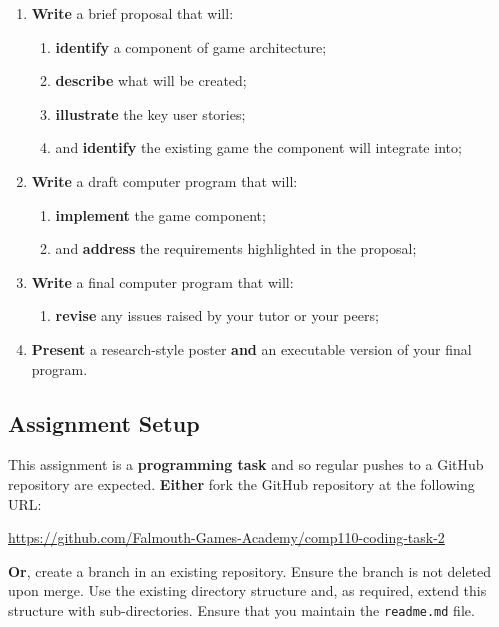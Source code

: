 \documentclass{../fal_assignment}
\begin{document}
\begin{enumerate}[label=(\alph*)]
    \item \textbf{Write} a brief proposal that will:
    	\begin{enumerate}[label=\roman*.]
    		\item \textbf{identify} a component of game architecture;
    		\item \textbf{describe} what will be created;
    		\item \textbf{illustrate} the key user stories;
    		\item and \textbf{identify} the existing game the component will integrate into;
	\end{enumerate}
    \item \textbf{Write} a draft computer program that will:
        	\begin{enumerate}[label=\roman*.]
    		\item \textbf{implement} the game component;
    		\item and \textbf{address} the requirements highlighted in the proposal;
	\end{enumerate}
    \item \textbf{Write} a final computer program that will:
    	\begin{enumerate}[label=\roman*.]
    		\item \textbf{revise} any issues raised by your tutor or your peers;
	\end{enumerate}
    \item \textbf{Present} a research-style poster \textbf{and} an executable version of your final program.
\end{enumerate}


\subsection*{Assignment Setup}

This assignment is a \textbf{programming task} and so regular pushes to a GitHub repository are expected. \textbf{Either} fork the GitHub repository at the following URL:

\indent \url{https://github.com/Falmouth-Games-Academy/comp110-coding-task-2}

\textbf{Or}, create a branch in an existing repository. Ensure the branch is not deleted upon merge. Use the existing directory structure and, as required, extend this structure with sub-directories. Ensure that you maintain the \texttt{readme.md} file.
\end{document}
